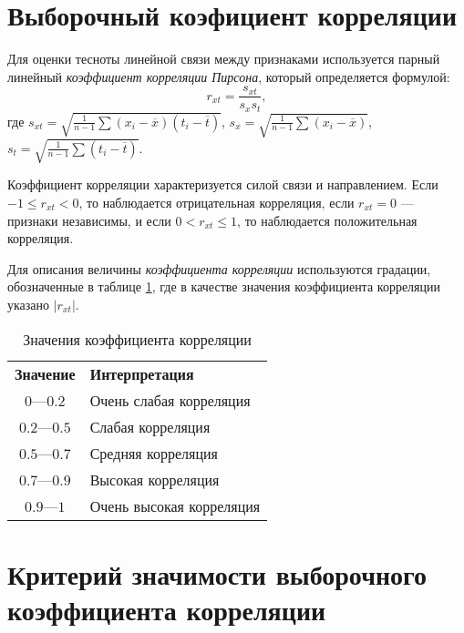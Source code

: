\section*{Выборочный коэфициент корреляции} %
\label{sec:correlation}

Для оценки тесноты линейной связи между признаками используется парный линейный \textit{коэффициент корреляции Пирсона}, который определяется формулой:
\begin{equation}
\label{eq:correlation}
	r_{xt} = \frac{s_{xt}}{s_x s_t},
\end{equation}
где $s_{xt} = \sqrt{\frac{1}{n - 1} \sum{(x_i - \overline{x})(t_i - \overline{t})}}$, $s_x = \sqrt{\frac{1}{n - 1} \sum{(x_i-\overline{x})}}$, $s_t = \sqrt{\frac{1}{n - 1} \sum{(t_i - \overline{t})}}$.

Коэффициент корреляции характеризуется силой связи и направлением. Если $-1 \le r_{xt} < 0$, то наблюдается отрицательная корреляция, если $r_{xt} = 0$ --- признаки независимы, и если $0 < r_{xt} \le 1$, то наблюдается положительная корреляция.

Для описания величины \textit{коэффициента корреляции} используются градации, обозначенные в таблице \ref{table:corr}, где в качестве значения коэффициента корреляции указано $\vert r_{xt} \vert$.
\begin{center}
\begin{table}[h]
\label{table:corr}
	\caption{Значения коэффициента корреляции}
	\centering
	\begin{tabular}{c|l}
		\textbf{Значение} & \textbf{Интерпретация} \\
		$0$---$0.2$ & Очень слабая корреляция \\
		$0.2$---$0.5$ & Слабая корреляция \\
		$0.5$---$0.7$ & Средняя корреляция \\
		$0.7$---$0.9$ & Высокая корреляция \\
		$0.9$---$1$ & Очень высокая корреляция \\
	\end{tabular}
\end{table}
\end{center}

\section*{Критерий значимости выборочного коэффициента корреляции} %
\label{subsec:sign_corr}

